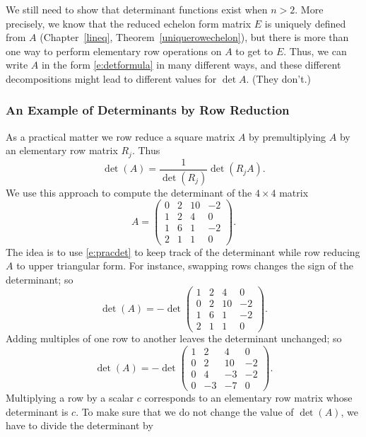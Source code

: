\documentclass{ximera}
\begin{document}
We still need to show that determinant functions exist when $n>2$.  More 
precisely, we know that the reduced echelon form matrix $E$ is uniquely 
defined from $A$ (Chapter~\ref{lineq}, Theorem~\ref{uniquerowechelon}), but 
there is more than one way to perform elementary row operations on $A$ to 
get to $E$.  Thus, we can write $A$ in the form \eqref{e:detformula} in many 
different ways, and these different decompositions might lead to different 
values for $\det A$.  (They don't.)

\subsubsection*{An Example of Determinants by Row Reduction}

As a practical matter we row reduce a square matrix $A$ by 
premultiplying $A$ by an elementary row matrix $R_j$.  Thus 
\begin{equation} \label{e:pracdet}
\det(A) = \frac{1}{\det(R_j)} \det (R_j A).
\end{equation}
We use this approach to compute the determinant of the 
$4\times 4$ matrix 
\[
A = \left(\begin{array}{rrrr} 0 & 2 & 10 & -2 \\ 1 & 2 & 4 & 0\\
1 & 6 & 1 & -2 \\ 2 & 1 & 1 & 0 \end{array}\right).
\]
The idea is to use \eqref{e:pracdet} to keep track of the 
determinant while row reducing $A$ to upper triangular form. 
For instance, swapping rows changes the sign of the determinant; 
so
\[
\det(A) = -\det\left(\begin{array}{rrrr} 1 & 2 & 4 & 0\\ 0 & 2 & 10 & -2 \\
1 & 6 & 1 & -2 \\ 2 & 1 & 1 & 0 \end{array}\right).
\]
Adding multiples of one row to another leaves the determinant
unchanged; so
\[
\det(A) = -\det\left(\begin{array}{rrrr} 1 & 2 & 4 & 0\\ 0 & 2 & 10 & -2 \\
0 & 4 & -3 & -2 \\ 0 & -3 & -7 & 0 \end{array}\right).
\]
Multiplying a row by a scalar $c$ corresponds to an elementary 
row matrix whose determinant is $c$.  To make sure that we do not 
change the value of $\det(A)$, we have to divide the determinant by 
\end{document}
